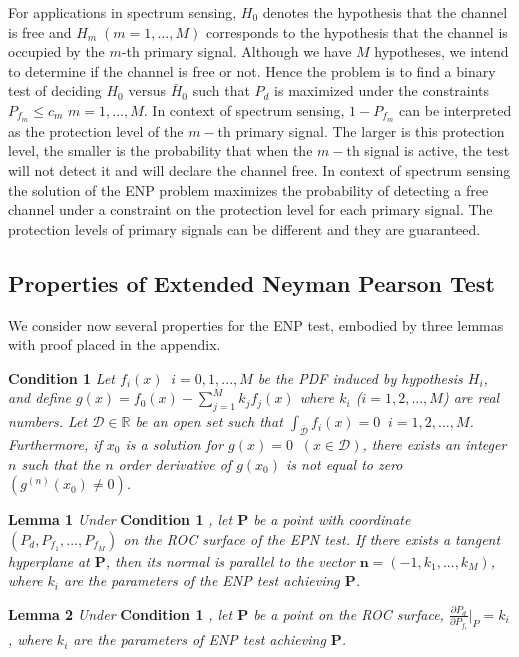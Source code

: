 \documentclass[12pt,journal,a4paper,twoside,onecolumn,draft]{IEEEtran}
\begin{document}
\begin{spacing}{2.5}
For applications in spectrum sensing, $H_0$ denotes the hypothesis that the channel is free and $H_m \;(m=1, ..., M)$ corresponds to the hypothesis that the channel is occupied by the $m$-th primary signal. Although we have $M$ hypotheses, we intend to determine if the channel is free or not. Hence the problem is to find a binary test of deciding $H_0$ versus $\bar{H}_0$ such that $P_d$ is maximized under the constraints $P_{f_m} \leq c_m$ $m = 1, ..., M$. In context of spectrum sensing, $1-P_{f_m}$ can be interpreted as the protection level of the $m-$th primary signal. The larger is this protection level, the smaller is the probability that when the $m-$th signal is active, the test will not detect it and will declare the channel free. In context of spectrum sensing the solution of the ENP problem maximizes the probability of detecting a free channel under a constraint on the protection level for each primary signal. The protection levels of primary signals can be different and they are guaranteed.

\subsection{Properties of Extended Neyman Pearson Test}
We consider now several properties for the ENP test, embodied by three lemmas with proof placed in the appendix.

\noindent \textbf{Condition 1}
\textit{
\noindent Let $f_i(x) \;\;i=0, 1, ..., M$ be the PDF induced by hypothesis $H_i$, and define $g(x) = f_0(x) - \sum_{j=1}^{M} k_jf_j(x)$ where $k_i$  ($i = 1, 2, ..., M$) are real numbers. Let $\mathcal{D} \in \mathbb{R}$ be an open set such that $\int_{\bar{\mathcal{D}}}f_i(x)=0\;\;i = 1, 2, ..., M$. Furthermore,  if $x_0$ is a solution  for $g(x) = 0 \;\;(x \in \mathcal{D})$, there exists an integer $n$ such that  the $n$ order derivative of $g(x_0)$ is not equal to zero $(g^{(n)}(x_0) \neq 0)$.
}

\noindent \textbf{Lemma 1}
\textit{
\noindent Under}
\textbf{Condition 1}
\textit{, let $\mathbf{P}$ be a point with coordinate $(P_d, P_{f_1}, ..., P_{f_M})$ on the ROC surface of the EPN test. If there exists a tangent hyperplane at $\mathbf{P}$, then its normal is parallel to the vector $\mathbf{n} = (-1, k_1, ..., k_M)$, where $k_i$ are the parameters of the ENP test achieving $\mathbf{P}$.
}

\noindent \textbf{Lemma 2}
\textit{
\noindent
Under}
\textbf{Condition 1}
\textit{, let $\mathbf{P}$ be a point on the ROC surface, $\frac{\partial P_d}{\partial P_{f_i}} \bigg|_P = k_i$, where $k_i$ are the parameters of ENP test achieving $\mathbf{P}$.
}


\end{spacing}
\end{document}
